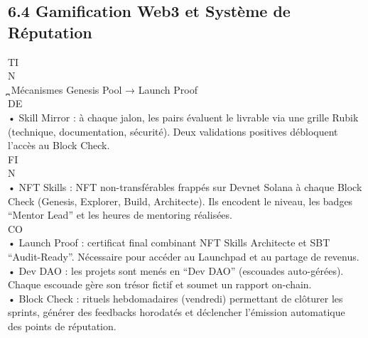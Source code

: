\subsection{6.4 Gamification Web3 et Système de Réputation}
\vspace{0.5em}
\vspace{0.5em}
\vspace{0.5em}
\vspace{0.5em}
TI\\
N\\
̪ Mécanismes Genesis Pool → Launch Proof\\
\vspace{0.5em}
\vspace{0.5em}
\vspace{0.5em}
\vspace{0.5em}
DE\\
• Skill Mirror : à chaque jalon, les pairs évaluent le livrable via une grille Rubik (technique, documentation, sécurité). Deux validations positives débloquent\\
l’accès au Block Check.\\
\vspace{0.5em}
\vspace{0.5em}
\vspace{0.5em}
\vspace{0.5em}
FI\\
N\\
• NFT Skills : NFT non-transférables frappés sur Devnet Solana à chaque Block Check (Genesis, Explorer, Build, Architecte). Ils encodent le niveau, les badges\\
“Mentor Lead” et les heures de mentoring réalisées.\\
CO\\
• Launch Proof : certificat final combinant NFT Skills Architecte et SBT “Audit-Ready”. Nécessaire pour accéder au Launchpad et au partage de revenus.\\
• Dev DAO : les projets sont menés en “Dev DAO” (escouades auto-gérées). Chaque escouade gère son trésor fictif et soumet un rapport on-chain.\\
• Block Check : rituels hebdomadaires (vendredi) permettant de clôturer les sprints, générer des feedbacks horodatés et déclencher l’émission automatique\\
des points de réputation.\\
\vspace{0.5em}
\vspace{0.5em}
\vspace{0.5em}
